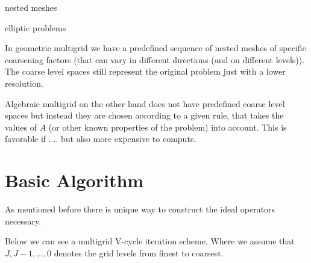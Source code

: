 \documentclass[../draft_1.tex]{subfiles}
\begin{document}
nested meshes

elliptic problems


In geometric multigrid we have a predefined sequence of nested meshes of specific coarsening factors (that can vary in different directions (and on different levels)). The coarse level spaces still represent the original problem just with a lower resolution. 

Algebraic multigrid on the other hand does not have predefined coarse level spaces but instead they are chosen according to a given rule, that takes the values of $A$ (or other known properties of the problem) into account. This is favorable if .... but also more expensive to compute. 


\section{Basic Algorithm} 


As mentioned before there is unique way to construct the ideal operators necessary. 

Below we can see a multigrid V-cycle iteration scheme. Where we assume that $J, J-1, ..., 0$ denotes the grid levels from finest to coarsest.
\end{document}
